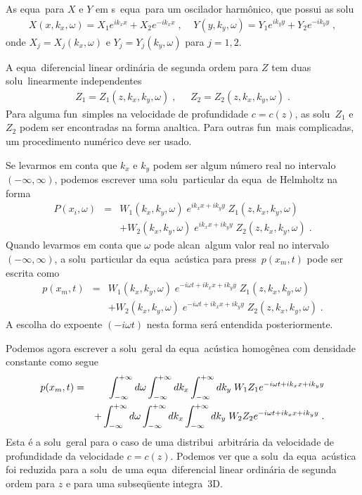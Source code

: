 As equa\coes\ para $X$ e $Y$ em  s\ao\ equa\coes\ para
um oscilador harm\^onico, que possui as solu\coes\
\begin{eqnarray}
X(x,k_x,\omega) = X_1 e^{ik_x x} + X_2 e^{-ik_x x} \; , \;\;\;\;
Y(y,k_y,\omega) = Y_1 e^{ik_y y} + Y_2 e^{-ik_y y} \; ,
\end{eqnarray}
onde $X_j = X_j(k_x,\omega)$ e $Y_j = Y_j(k_y,\omega)$  para $j=1,2$.

A equa\cao\ diferencial linear ordin\'aria de segunda ordem para $Z$
tem duas solu\coes\ linearmente independentes
\begin{eqnarray}
Z_1 = Z_1(z,k_x,k_y,\omega) \; , \;\;\;\;\;
Z_2 = Z_2(z,k_x,k_y,\omega) \; .
\end{eqnarray}
Para alguma fun\cao\ simples na velocidade de profundidade $c=c(z)$,
as solu\coes\ $Z_1$ e $Z_2$ podem ser encontradas na forma anal\ih tica.
Para outras fun\coes\ mais complicadas, um procedimento num\'erico deve ser
usado.

Se levarmos em conta que $k_x$ e $k_y$ podem ser algum n\'umero real
no intervalo $(-\infty,\infty)$, podemos escrever uma solu\cao\ particular
da equa\cao\ de Helmholtz na forma
\begin{eqnarray}
P(x_i,\omega) &=& W_1(k_x,k_y,\omega) \; e^{ik_x x + ik_y y} \;
Z_1(z,k_x,k_y,\omega) \nonumber \\
& & + W_2(k_x,k_y,\omega) \; e^{ik_x x + ik_y y} \;
Z_2(z,k_x,k_y,\omega) \; .
\end{eqnarray}
Quando levarmos em conta que $\omega$ pode alcan\car\ algum valor
real no intervalo $(-\infty,\infty)$, a solu\cao\ particular da
equa\cao\ ac\'ustica para press\ao\ $p(x_m,t)$ pode ser escrita como
\begin{eqnarray}
p(x_m,t) &=& W_1(k_x,k_y,\omega) \; e^{-i\omega t + ik_x x + ik_y y} \;
Z_1(z,k_x,k_y,\omega) \nonumber \\
& & + W_2(k_x,k_y,\omega) \; e^{-i\omega t + ik_x x + ik_y y} \;
Z_2(z,k_x,k_y,\omega) \; .
\end{eqnarray}
A escolha do expoente $(-i\omega t)$ nesta forma ser\'a entendida
posteriormente.

Podemos agora escrever a solu\cao\ geral da equa\cao\ ac\'ustica
homog\^enea com densidade constante como segue
\begin{eqnarray}
p(x_m,t) &=& \int_{-\infty}^{+\infty} d\omega \int_{-\infty}^{+\infty} dk_x \int_{-\infty}^{+\infty} dk_y \; W_1 Z_1
e^{-i\omega t + ik_x x + ik_y y} \nonumber \\
& & + \int_{-\infty}^{+\infty} d\omega \int_{-\infty}^{+\infty} dk_x \int_{-\infty}^{+\infty} dk_y \; W_2 Z_2
e^{-i\omega t + ik_x x + ik_y y} \; .
\end{eqnarray}
Esta \'e a solu\cao\ geral para o caso de uma distribui\cao\ arbitr\'aria
da velocidade de profundidade da velocidade $c=c(z)$. Podemos ver que
a solu\cao\ da equa\cao\ ac\'ustica foi reduzida para a solu\cao\ de
uma equa\cao\ diferencial linear ordin\'aria de segunda ordem para $z$
e para uma subseq\"uente integra\cao\ 3D.

